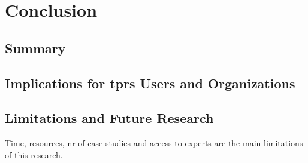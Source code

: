 
\newpage
\section{Conclusion}


\subsection{Summary}




\subsection{Implications for \ac{tprs} Users and Organizations}


\subsection{Limitations and Future Research}

Time, resources, nr of case studies and access to experts are the main limitations of this research.
